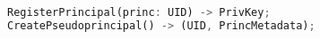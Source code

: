 \begin{figure}[t]
\begin{lstlisting}[language=Rust, style=rust]
RegisterPrincipal(princ: UID) -> PrivKey;
CreatePseudoprincipal() -> (UID, PrincMetadata);


\end{lstlisting}
\end{figure}
